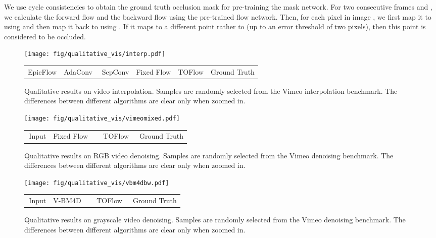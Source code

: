 \documentclass[twocolumn,natbib]{svjour3}          \smartqed  \usepackage{graphicx}
\begin{document}
We use cycle consistencies to obtain the ground truth occlusion mask for pre-training the mask network. For two consecutive frames  and , we calculate the forward flow  and the backward flow  using the pre-trained flow network. Then, for each pixel  in image , we first map it to  using  and then map it back to  using . If it maps to a different point rather to  (up to an error threshold of two pixels), then this point is considered to be occluded.  \begin{figure*}[p]
    \centering
    \texttt{[image: fig/qualitative\_vis/interp.pdf]}
    \setlength{\tabcolsep}{22pt}
    \begin{tabular}{cccccc}
        EpicFlow & AdaConv & \,\,SepConv & \!Fixed Flow & TOFlow & \!\!\!\!\!\! Ground Truth \\
    \end{tabular}
    \caption{Qualitative results on video interpolation. Samples are randomly selected from the Vimeo interpolation benchmark. The differences between different algorithms are clear only when zoomed in.}
    \label{fig:qualitativeinterp}
\end{figure*} \begin{figure*}[p]
    \centering
    \texttt{[image: fig/qualitative\_vis/vimeomixed.pdf]}
    \begin{tabular}{C{4.2cm}C{3.2cm}C{3.2cm}C{4.2cm}}
         \,Input & \!\!Fixed Flow & \,\,\,\,\,\,\,TOFlow & \,\,\,Ground Truth\\
    \end{tabular}
    \caption{Qualitative results on RGB video denoising. Samples are randomly selected from the Vimeo denoising benchmark. The differences between different algorithms are clear only when zoomed in.}
    \label{fig:qualitativedenoisecolor}
\end{figure*} \begin{figure*}[p]
    \centering
    \texttt{[image: fig/qualitative\_vis/vbm4dbw.pdf]}
    \begin{tabular}{C{4.2cm}C{3.2cm}C{3.2cm}C{4.2cm}}
         \,Input & \!V-BM4D & \,\,\,\,\,\,\,TOFlow & \,\,\,Ground Truth\\
    \end{tabular}
    \caption{Qualitative results on grayscale video denoising. Samples are randomly selected from the Vimeo denoising benchmark. The differences between different algorithms are clear only when zoomed in.}
    \label{fig:qualitativedenoisebw}
\end{figure*} \begin{figure*}[p]

\end{figure*}
\end{document}
